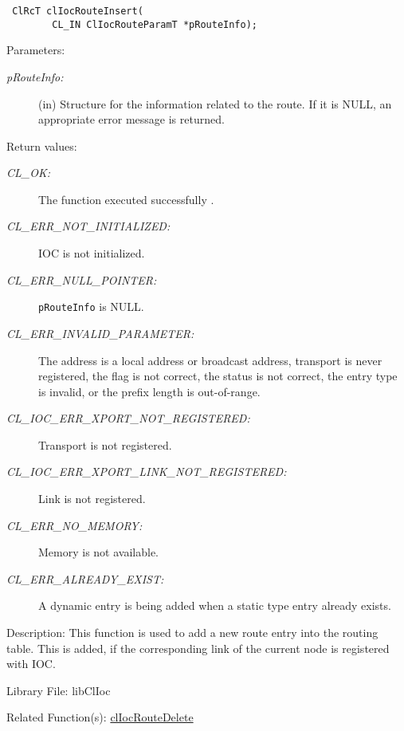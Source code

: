 \begin{flushleft}
\begin{Desc}
\footnotesize\begin{verbatim} ClRcT clIocRouteInsert(
        CL_IN ClIocRouteParamT *pRouteInfo);
\end{verbatim}
\normalsize
\end{Desc}
\begin{Desc}
\item[Parameters:]
\begin{description}
\item[{\em p\-Route\-Info:}](in) Structure for the information related to the route. If it is NULL, an appropriate error message is returned.\end{description}
\end{Desc}
\begin{Desc}
\item[Return values:]
\begin{description}
\item[{\em CL\_\-OK:}]The function executed successfully . \item[{\em CL\_\-ERR\_\-NOT\_\-INITIALIZED:}] IOC is not initialized. 
\item[{\em CL\_\-ERR\_\-NULL\_\-POINTER:}]{\tt{p\-Route\-Info}} is NULL. 
\item[{\em CL\_\-ERR\_\-INVALID\_\-PARAMETER:}]The address is a local address or broadcast address, transport is never registered, the flag is not 
correct, the status is not correct, the entry type is invalid, or the prefix length is out-of-range. 
\item[{\em CL\_\-IOC\_\-ERR\_\-XPORT\_\-NOT\_\-REGISTERED:}]Transport is not registered. 
\item[{\em CL\_\-IOC\_\-ERR\_\-XPORT\_\-LINK\_\-NOT\_\-REGISTERED:}]Link is not registered. 
\item[{\em CL\_\-ERR\_\-NO\_\-MEMORY:}]Memory is not available. 
\item[{\em CL\_\-ERR\_\-ALREADY\_\-EXIST:}]A dynamic entry is being added when a static type entry already exists.\end{description}
\end{Desc}
\begin{Desc}
\item[Description:]This function is used to add a new route entry into the routing table. This is added, if the corresponding link of the current 
node is registered with IOC.\end{Desc}
\begin{Desc}
\item[Library File:]libClIoc\end{Desc}
\begin{Desc}
\item[Related Function(s):]\hyperlink{pageioc204}{cl\-Ioc\-Route\-Delete} \end{Desc}
\newpage



\end{flushleft}
